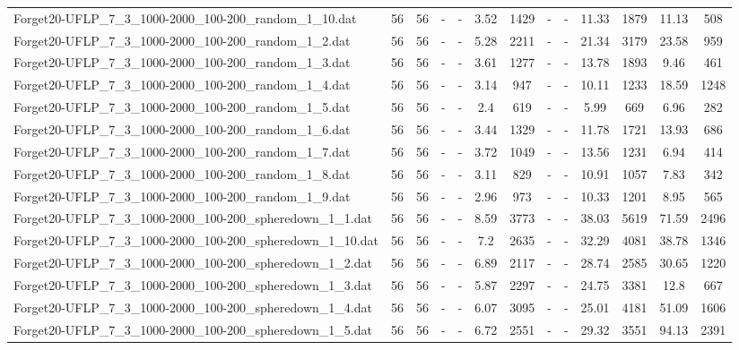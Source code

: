 \begin{table}[!ht]
{\begin{tabular}{lcccccccccccc}
Forget20-UFLP\_7\_3\_1000-2000\_100-200\_random\_1\_10.dat & 56 & 56 &  - &  - & 3.52 & 1429 &  - &  - & 11.33 & 1879 & 11.13 & 508 \\
Forget20-UFLP\_7\_3\_1000-2000\_100-200\_random\_1\_2.dat & 56 & 56 &  - &  - & 5.28 & 2211 &  - &  - & 21.34 & 3179 & 23.58 & 959 \\
Forget20-UFLP\_7\_3\_1000-2000\_100-200\_random\_1\_3.dat & 56 & 56 &  - &  - & 3.61 & 1277 &  - &  - & 13.78 & 1893 & 9.46 & 461 \\
Forget20-UFLP\_7\_3\_1000-2000\_100-200\_random\_1\_4.dat & 56 & 56 &  - &  - & 3.14 & 947 &  - &  - & 10.11 & 1233 & 18.59 & 1248 \\
Forget20-UFLP\_7\_3\_1000-2000\_100-200\_random\_1\_5.dat & 56 & 56 &  - &  - & 2.4 & 619 &  - &  - & 5.99 & 669 & 6.96 & 282 \\
Forget20-UFLP\_7\_3\_1000-2000\_100-200\_random\_1\_6.dat & 56 & 56 &  - &  - & 3.44 & 1329 &  - &  - & 11.78 & 1721 & 13.93 & 686 \\
Forget20-UFLP\_7\_3\_1000-2000\_100-200\_random\_1\_7.dat & 56 & 56 &  - &  - & 3.72 & 1049 &  - &  - & 13.56 & 1231 & 6.94 & 414 \\
Forget20-UFLP\_7\_3\_1000-2000\_100-200\_random\_1\_8.dat & 56 & 56 &  - &  - & 3.11 & 829 &  - &  - & 10.91 & 1057 & 7.83 & 342 \\
Forget20-UFLP\_7\_3\_1000-2000\_100-200\_random\_1\_9.dat & 56 & 56 &  - &  - & 2.96 & 973 &  - &  - & 10.33 & 1201 & 8.95 & 565 \\
Forget20-UFLP\_7\_3\_1000-2000\_100-200\_spheredown\_1\_1.dat & 56 & 56 &  - &  - & 8.59 & 3773 &  - &  - & 38.03 & 5619 & 71.59 & 2496 \\
Forget20-UFLP\_7\_3\_1000-2000\_100-200\_spheredown\_1\_10.dat & 56 & 56 &  - &  - & 7.2 & 2635 &  - &  - & 32.29 & 4081 & 38.78 & 1346 \\
Forget20-UFLP\_7\_3\_1000-2000\_100-200\_spheredown\_1\_2.dat & 56 & 56 &  - &  - & 6.89 & 2117 &  - &  - & 28.74 & 2585 & 30.65 & 1220 \\
Forget20-UFLP\_7\_3\_1000-2000\_100-200\_spheredown\_1\_3.dat & 56 & 56 &  - &  - & 5.87 & 2297 &  - &  - & 24.75 & 3381 & 12.8 & 667 \\
Forget20-UFLP\_7\_3\_1000-2000\_100-200\_spheredown\_1\_4.dat & 56 & 56 &  - &  - & 6.07 & 3095 &  - &  - & 25.01 & 4181 & 51.09 & 1606 \\
Forget20-UFLP\_7\_3\_1000-2000\_100-200\_spheredown\_1\_5.dat & 56 & 56 &  - &  - & 6.72 & 2551 &  - &  - & 29.32 & 3551 & 94.13 & 2391 \\

\end{tabular}}
\end{table}
